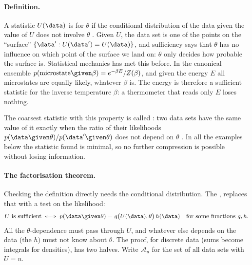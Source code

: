 \paragraph{Definition.}
A statistic $U(\data)$ is  for $\theta$ if the
conditional distribution of the data given the value of $U$ does not involve
$\theta$ . Given $U$, the data set is one of the
points on the ``surface'' $\{\data':U(\data')=U(\data)\}$, and sufficiency
says that $\theta$ has no influence on which point of the surface we land
on: $\theta$ only decides how probable the surface is. Statistical
mechanics has met this before. In the canonical ensemble
$p(\text{microstate}\given\beta)=e^{-\beta E}/Z(\beta)$, and given the energy
$E$ all microstates are equally likely, whatever $\beta$ is. The energy is
therefore a sufficient statistic for the inverse temperature $\beta$: a
thermometer that reads only $E$ loses nothing.

The coarsest statistic with this property is called : two data sets have the same value of it exactly when the ratio
of their likelihoods $p(\data\given\theta)/p(\data'\given\theta)$ does not
depend on $\theta$ . In all the examples below the statistic
found is minimal, so no further compression is possible without losing
information.

\paragraph{The factorisation theorem.}
Checking the definition directly needs the conditional distribution. The
 ,
 replaces that with a test on the
likelihood:
\[
  U\text{ is sufficient}\iff
  p(\data\given\theta)=g\bigl(U(\data),\theta\bigr)\,h(\data)
  \quad\text{for some functions }g,h .
\]
All the $\theta$-dependence must pass through $U$, and whatever else depends
on the data (the $h$) must not know about $\theta$. The proof, for discrete
data (sums become integrals for densities), has two halves. Write $\mathcal A_u$ for
the set of all data sets with $U=u$.

